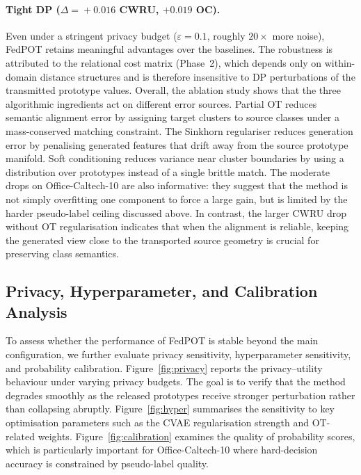 \documentclass[a4paper,fleqn]{cas-sc}
\begin{document}
\paragraph{Tight DP ($\Delta\!=\!+0.016$ CWRU, $+0.019$ OC).}
Even under a stringent privacy budget ($\varepsilon=0.1$, roughly
$20\times$ more noise), FedPOT retains meaningful advantages over
the baselines.
The robustness is attributed to the relational cost matrix (Phase~2),
which depends only on within-domain distance structures and is therefore
insensitive to DP perturbations of the transmitted prototype values.
Overall, the ablation study shows that the three algorithmic ingredients
act on different error sources. Partial OT reduces semantic alignment
error by assigning target clusters to source classes under a mass-conserved
matching constraint. The Sinkhorn regulariser reduces generation error by
penalising generated features that drift away from the source prototype
manifold. Soft conditioning reduces variance near cluster boundaries by
using a distribution over prototypes instead of a single brittle match.
The moderate drops on Office-Caltech-10 are also informative: they suggest
that the method is not simply overfitting one component to force a large
gain, but is limited by the harder pseudo-label ceiling discussed above.
In contrast, the larger CWRU drop without OT regularisation indicates that
when the alignment is reliable, keeping the generated view close to the
transported source geometry is crucial for preserving class semantics.
\FloatBarrier

\subsection{Privacy, Hyperparameter, and Calibration Analysis}
\label{sec:diagnostics}

To assess whether the performance of FedPOT is stable beyond the main
configuration, we further evaluate privacy sensitivity, hyperparameter
sensitivity, and probability calibration. Figure~\ref{fig:privacy} reports
the privacy--utility behaviour under varying privacy budgets. The goal is to
verify that the method degrades smoothly as the released prototypes receive
stronger perturbation rather than collapsing abruptly. Figure~\ref{fig:hyper}
summarises the sensitivity to key optimisation parameters such as the CVAE
regularisation strength and OT-related weights. Figure~\ref{fig:calibration}
examines the quality of probability scores, which is particularly important
for Office-Caltech-10 where hard-decision accuracy is constrained by
pseudo-label quality.
\end{document}
